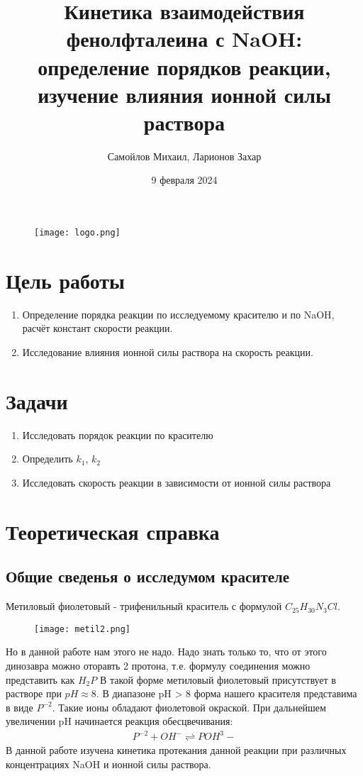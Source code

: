 \documentclass{article}
\author{Самойлов Михаил, Ларионов Захар}
\title{Кинетика взаимодействия фенолфталеина с NaOH:\\
определение порядков реакции,\\ изучение влияния ионной силы раствора}
\date{9 февраля 2024}
\begin{document}
\maketitle 
\begin{figure}[b]
    \centering
    \texttt{[image: logo.png]}
\end{figure}
\newpage

\section{Цель работы}
\begin{enumerate}
    \item Определение порядка реакции по исследуемому красителю и по NaOH, расчёт констант скорости реакции.
    \item Исследование влияния ионной силы раствора на скорость реакции.
\end{enumerate}


\section{Задачи}
\begin{enumerate}
    \item Исследовать порядок реакции по красителю 
    \item Определить $k_1$, $k_2$
    \item Исследовать скорость реакции в зависимости от ионной силы раствора 
\end{enumerate}

\section{Теоретическая справка}
\subsection{Общие сведенья о исследумом красителе}
Метиловый фиолетовый - трифенильный краситель с формулой $C_{25}H_{30}N_3Cl$.

\begin{figure}[H]
    \centering
    \texttt{[image: metil2.png]}
    \label{fig:enter-label}
\end{figure}

Но в данной работе нам этого не надо. Надо знать только то, что от этого динозавра можно оторавть 2 протона, т.е. формулу соединения можно представить как $H_2P$
В такой форме метиловый фиолетовый присутствует в растворе при $pH \approx 8$. В диапазоне pH > 8 форма нашего красителя представима в виде $P^{-2}$. Такие ионы обладают фиолетовой окраской. При дальнейшем увеличении pH начинается реакция обесцвечивания:
\begin{gather}
    P^{-2} + OH^- \rightleftharpoons POH^3-
\end{gather}
В данной работе изучена кинетика протекания данной реакции при различных концентрациях NaOH и ионной силы раствора.
\end{document}
